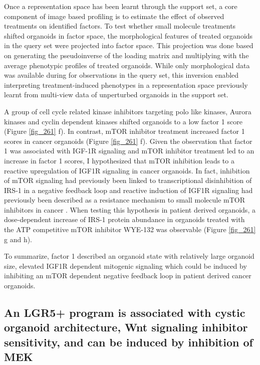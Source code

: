 \begin{flushleft}
\bigbreak
Once a representation space has been learnt through the support set, a core component of image based profiling is to estimate the effect of observed treatments on identified factors. To test whether small molecule treatments shifted organoids in factor space, the morphological features of treated organoids in the query set were projected into factor space. This projection was done based on generating the pseudoinverse of the loading matrix and multiplying with the average phenotypic profiles of treated organoids. While only morphological data was available during for observations in the query set, this inversion enabled interpreting treatment-induced phenotypes in a representation space previously learnt from multi-view data of unperturbed organoids in the support set. 

\bigbreak
A group of cell cycle related kinase inhibitors targeting polo like kinases, Aurora kinases and cyclin dependent kinases shifted organoids to a low factor 1 score (Figure \ref{fig_261} f). In contrast, mTOR inhibitor treatment increased factor 1 scores in cancer organoids (Figure \ref{fig_261} f). Given the observation that factor 1 was associated with IGF-1R signaling and mTOR inhibitor treatment led to an increase in factor 1 scores, I hypothesized that mTOR inhibition leads to a reactive upregulation of IGF1R signaling in cancer organoids. In fact, inhibition of mTOR signaling had previously been linked to transcriptional disinhibition of IRS-1 in a negative feedback loop \citep{OReilly2006-fc} and  reactive induction of IGF1R signaling had previously been described as a resistance mechanism to small molecule mTOR inhibitors in cancer \citep{Sharma2010-qa}. When testing this hypothesis in patient derived organoids, a dose-dependent increase of IRS-1 protein abundance in organoids treated with the ATP competitive mTOR inhibitor WYE-132 was observable (Figure \ref{fig_261} g and h). 

\bigbreak
To summarize, factor 1 described an organoid state with relatively large organoid size, elevated IGF1R dependent mitogenic signaling which could be induced by inhibiting an mTOR dependent negative feedback loop in patient derived cancer organoids.

\newpage
\subsection{An LGR5+ program is associated with cystic organoid architecture, Wnt signaling inhibitor sensitivity, and can be induced by inhibition of MEK}


\end{flushleft}

